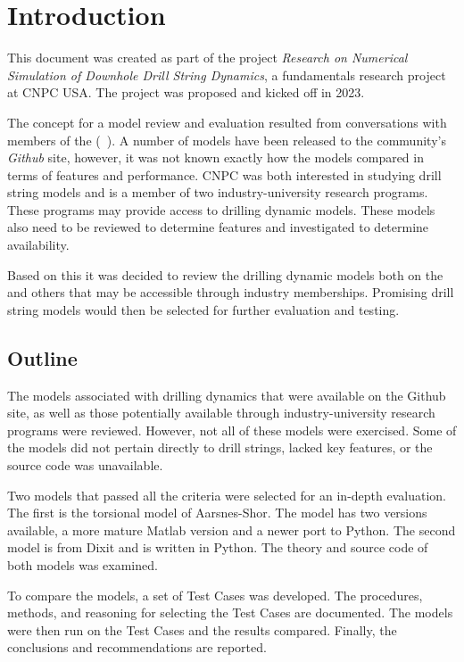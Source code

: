 \chapter{Introduction}
This document was created as part of the project \emph{Research on Numerical Simulation of Downhole Drill String Dynamics}, a fundamentals research project at CNPC USA.  The project was proposed and kicked off in 2023.

The concept for a model review and evaluation resulted from conversations with members of the \osdc{} (~\cite{ref:pastusek2019a}).  A number of models have been released to the community's \emph{Github} site, however, it was not known exactly how the models compared in terms of features and performance.  CNPC was both interested in studying drill string models and is a member of two industry-university research programs.  These programs may provide access to drilling dynamic models.  These models also need to be reviewed to determine features and investigated to determine availability.

Based on this it was decided to review the drilling dynamic models both on the \osdc{} and others that may be accessible through industry memberships.  Promising drill string models would then be selected for further evaluation and testing.

\section{Outline}
The models associated with drilling dynamics that were available on the \osdc{} Github site, as well as those potentially available through industry-university research programs were reviewed.  However, not all of these models were exercised.  Some of the models did not pertain directly to drill strings, lacked key features, or the source code was unavailable.

Two models that passed all the criteria were selected for an in-depth evaluation.  The first is the torsional model of Aarsnes-Shor.  The model has two versions available, a more mature Matlab version and a newer port to Python.  The second model is from Dixit and is written in Python.  The theory and source code of both models was examined.

To compare the models, a set of Test Cases was developed.  The procedures, methods, and reasoning for selecting the Test Cases are documented.  The models were then run on the Test Cases and the results compared.  Finally, the conclusions and recommendations are reported.

